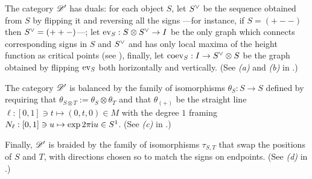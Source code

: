 The category $\mathscr{D}'_{}$ has duals: for each object $S$, let $\rdl{S}$ be the
sequence obtained from $S$ by flipping it and reversing all the signs
---for instance, if $S = (+--)$ then $\rdl{S} = (++-)$---; let $\ev_S:
S\otimes\rdl{S} \to I$ be the only graph which connects corresponding signs
in $S$ and $\rdl{S}$ and has only local maxima of the height function
as critical points (see ), finally, let $\coev_S : I \to
\rdl{S} \otimes S$ be the graph obtained by flipping $\operatorname{ev}_S$ both
horizontally and vertically. (See \textsl{(a)} and \textsl{(b)} in
.)

The category $\mathscr{D}'_{}$ is balanced by the family of isomorphisms $\theta_S: S
\to S$ defined by requiring that $\theta_{S\otimes T} := \theta_S \otimes \theta_T$ and
that $\theta_{(+)}$ be the straight line $\ell: [0,1] \ni t \mapsto (0,t,0) \in M$
with the degree $1$ framing $N_\ell: [0,1] \ni u \mapsto \exp 2\pi\mathrm{i} u \in
S^1$. (See \textsl{(c)} in .)

Finally, $\mathscr{D}'_{}$ is braided by the family of isomorphisms $\tau_{S,T}$
that swap the positions of $S$ and $T$, with directions chosen so to
match the signs on endpoints. (See \textsl{(d)} in
.)

